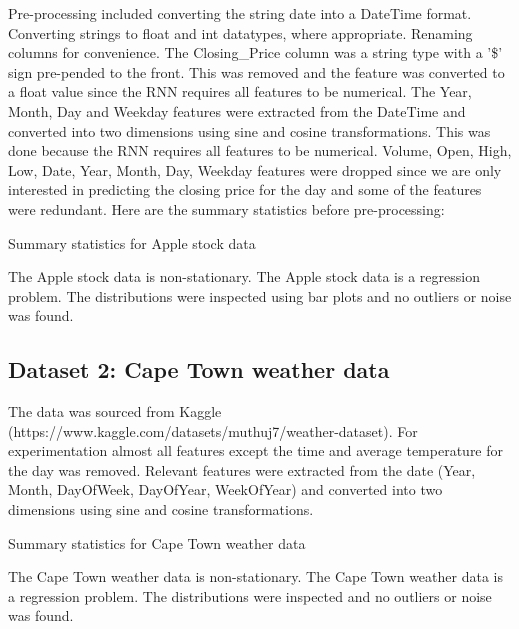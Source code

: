 \documentclass[conference]{IEEEtran}
\begin{document}
Pre-processing included converting the string date into a DateTime format. Converting strings to float and int datatypes, where appropriate. Renaming columns for convenience. The Closing\_Price column was a string type with a '\$' sign pre-pended to the front. This was removed and the feature was converted to a float value since the RNN requires all features to be numerical. The Year, Month, Day and Weekday features were extracted from the DateTime and converted into two dimensions using sine and cosine transformations. This was done because the RNN requires all features to be numerical. Volume, Open, High, Low, Date, Year, Month, Day, Weekday features were dropped since we are only interested in predicting the closing price for the day and some of the features were redundant. Here are the summary statistics before pre-processing:

\begin{table}[htbp]
	\caption{Summary statistics for Apple stock data}
	\label{tab:apple-stats}
\end{table}

The Apple stock data is non-stationary. The Apple stock data is a regression problem. The distributions were inspected using bar plots and no outliers or noise was found.

\subsection{Dataset 2: Cape Town weather data}

The data was sourced from Kaggle (https://www.kaggle.com/datasets/muthuj7/weather-dataset). For experimentation almost all features except the time and average temperature for the day was removed. Relevant features were extracted from the date (Year, Month, DayOfWeek, DayOfYear, WeekOfYear) and converted into two dimensions using sine and cosine transformations.

\begin{table}[htbp]
	\centering
	\small
	\caption{Summary statistics for Cape Town weather data}
	\label{tab:ct}
\end{table}


The Cape Town weather data is non-stationary. The Cape Town weather data is a regression problem. The distributions were inspected and no outliers or noise was found.
 
\end{document}
